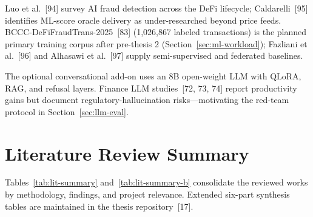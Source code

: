 \documentclass[12pt, a4paper]{report}
\begin{document}
Luo et al.~[94] survey AI fraud detection across the DeFi lifecycle; Caldarelli~[95] identifies ML-score oracle delivery as under-researched beyond price feeds. BCCC-DeFiFraudTrans-2025~[83] (1,026,867 labeled transactions) is the planned primary training corpus after pre-thesis 2 (Section~\ref{sec:ml-workload}); Fazliani et al.~[96] and Alhasawi et al.~[97] supply semi-supervised and federated baselines.

The optional conversational add-on uses an 8B open-weight LLM with QLoRA, RAG, and refusal layers. Finance LLM studies~[72, 73, 74] report productivity gains but document regulatory-hallucination risks---motivating the red-team protocol in Section~\ref{sec:llm-eval}.

\section{Literature Review Summary}

Tables~\ref{tab:lit-summary} and~\ref{tab:lit-summary-b} consolidate the reviewed works by methodology, findings, and project relevance. Extended six-part synthesis tables are maintained in the thesis repository~[17].
\end{document}
